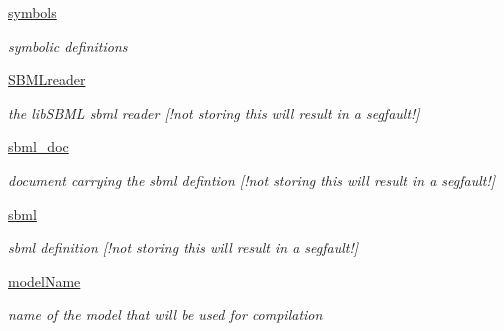 \begin{DoxyCompactItemize}
\mbox{\hyperlink{classamici_1_1sbml__import_1_1_sbml_importer_a591fb19f856c8faff2c302734ad80cc0}{symbols}}
\begin{DoxyCompactList}\small\item\em symbolic definitions \end{DoxyCompactList}\item 
\mbox{\label{classamici_1_1sbml__import_1_1_sbml_importer_a41c7300c6ec425f5b69356e0273cfac3}} 
\mbox{\hyperlink{classamici_1_1sbml__import_1_1_sbml_importer_a41c7300c6ec425f5b69356e0273cfac3}{S\+B\+M\+Lreader}}
\begin{DoxyCompactList}\small\item\em the lib\+S\+B\+ML sbml reader \mbox{[}!not storing this will result in a segfault!\mbox{]} \end{DoxyCompactList}\item 
\mbox{\label{classamici_1_1sbml__import_1_1_sbml_importer_a9526d93eea89065515a47d67fe8936de}} 
\mbox{\hyperlink{classamici_1_1sbml__import_1_1_sbml_importer_a9526d93eea89065515a47d67fe8936de}{sbml\+\_\+doc}}
\begin{DoxyCompactList}\small\item\em document carrying the sbml defintion \mbox{[}!not storing this will result in a segfault!\mbox{]} \end{DoxyCompactList}\item 
\mbox{\label{classamici_1_1sbml__import_1_1_sbml_importer_ac1e9dd522f751032fb0142ef8a78c3f4}} 
\mbox{\hyperlink{classamici_1_1sbml__import_1_1_sbml_importer_ac1e9dd522f751032fb0142ef8a78c3f4}{sbml}}
\begin{DoxyCompactList}\small\item\em sbml definition \mbox{[}!not storing this will result in a segfault!\mbox{]} \end{DoxyCompactList}\item 
\mbox{\label{classamici_1_1sbml__import_1_1_sbml_importer_adefaf64a0bbe772b9463fa2a9cba904e}} 
\mbox{\hyperlink{classamici_1_1sbml__import_1_1_sbml_importer_adefaf64a0bbe772b9463fa2a9cba904e}{model\+Name}}
\begin{DoxyCompactList}\small\item\em name of the model that will be used for compilation \end{DoxyCompactList}\item 

\end{DoxyCompactItemize}
